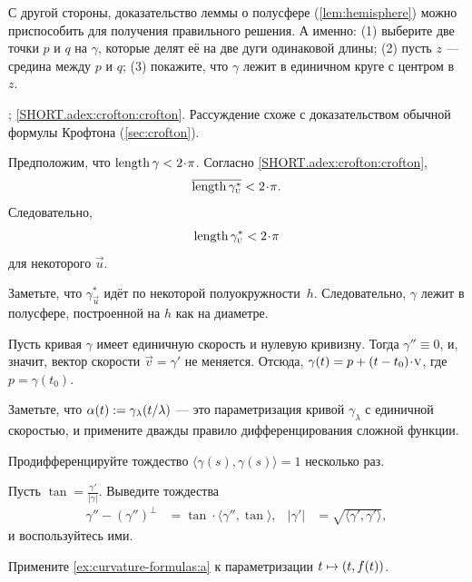 \begin{multicols}{2}
С другой стороны, доказательство леммы о полусфере (\ref{lem:hemisphere}) можно приспособить для получения правильного решения.
А именно: (1) выберите две точки $p$ и $q$ на $\gamma$, которые делят её на две дуги одинаковой длины;
(2) пусть $z$ --- средина между $p$ и $q$;
(3) покажите, что $\gamma$ лежит в единичном круге с центром в~$z$.

\parbf{\ref{adex:crofton}}; \ref{SHORT.adex:crofton:crofton}.
Рассуждение схоже с доказательством обычной формулы Крофтона (\ref{sec:crofton}).

Предположим, что $\length \gamma<2\cdot\pi$.
Согласно \ref{SHORT.adex:crofton:crofton},
\[\overline{\length \gamma^*_{\vec u}}<2\cdot\pi.\]
Следовательно, 
\[\length \gamma^*_{\vec u}<2\cdot\pi\]
для некоторого ${\vec u}$. 

Заметьте, что $\gamma^*_{\vec u}$ идёт по некоторой полуокружности~$h$.
Следовательно, $\gamma$ лежит в полусфере, построенной на $h$ как на диаметре.


\setcounter{eqtn}{0}

Пусть кривая $\gamma$ имеет единичную скорость и нулевую кривизну. 
Тогда $\gamma''\equiv 0$, и, значит, вектор скорости $\vec v=\gamma'$ не меняется.
Отсюда, $\gamma(t)\z=p+(t-t_0)\cdot \vec v$, где $p=\gamma(t_0)$.

Заметьте, что $\alpha(t)\mathrel{:=}\gamma_{\lambda}(t/\lambda)$ --- это параметризация кривой $ \gamma_{\lambda}$ с единичной скоростью,
и примените дважды правило дифференцирования сложной функции.

Продифференцируйте тождество $\langle\gamma(s),\gamma(s)\rangle=1$ несколько раз.

Пусть $\tan=\tfrac{\gamma'}{|\gamma|}$.
Выведите  тождества
\begin{align*}
\gamma''-(\gamma'')^\perp&=\tan\cdot\langle\gamma'',\tan\rangle,
&
|\gamma'|&=\sqrt{\langle \gamma',\gamma'\rangle},
\end{align*}
и воспользуйтесь ими.

Примените \ref{ex:curvature-formulas:a} к параметризации $t\z\mapsto (t,f(t))$.


\end{multicols}
